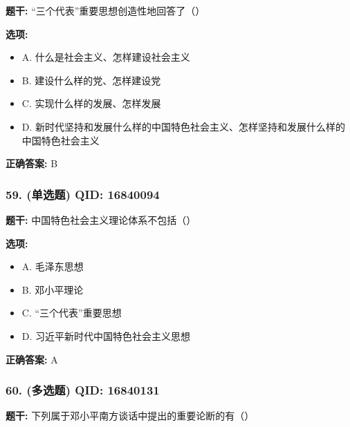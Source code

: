 \documentclass[12pt,UTF8]{ctexart}
\begin{document}
\textbf{题干:}
“三个代表”重要思想创造性地回答了（）

\textbf{选项:}
\begin{itemize}[leftmargin=*]

  \item A. 什么是社会主义、怎样建设社会主义

  \item B. 建设什么样的党、怎样建设党

  \item C. 实现什么样的发展、怎样发展

  \item D. 新时代坚持和发展什么样的中国特色社会主义、怎样坚持和发展什么样的中国特色社会主义

\end{itemize}

\textbf{正确答案:}
B

\vspace{0.3em}\hrulefill\vspace{0.7em}

\subsubsection*{59. (单选题) \small QID: 16840094}

\textbf{题干:}
中国特色社会主义理论体系不包括（）

\textbf{选项:}
\begin{itemize}[leftmargin=*]

  \item A. 毛泽东思想

  \item B. 邓小平理论

  \item C. “三个代表”重要思想

  \item D. 习近平新时代中国特色社会主义思想

\end{itemize}

\textbf{正确答案:}
A

\vspace{0.3em}\hrulefill\vspace{0.7em}

\subsubsection*{60. (多选题) \small QID: 16840131}

\textbf{题干:}
下列属于邓小平南方谈话中提出的重要论断的有（）
\end{document}
